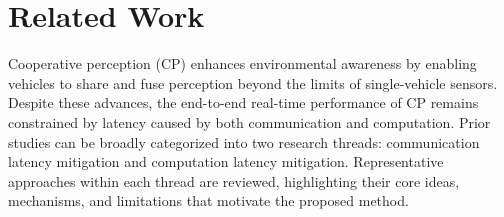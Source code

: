 
\noindent
\section{Related Work}
Cooperative perception (CP) enhances environmental awareness by enabling vehicles to share and fuse perception beyond the limits of single-vehicle sensors. Despite these advances, the end-to-end real-time performance of CP remains constrained by latency caused by both communication and computation. Prior studies can be broadly categorized into two research threads: communication latency mitigation and computation latency mitigation. Representative approaches within each thread are reviewed, highlighting their core ideas, mechanisms, and limitations that motivate the proposed method.




